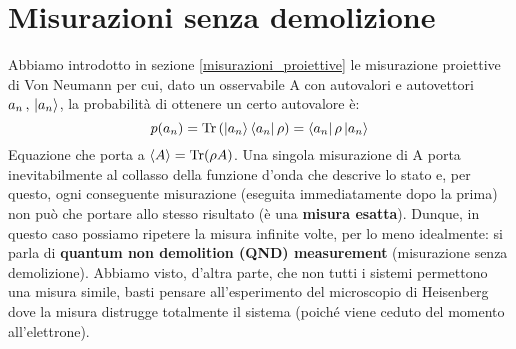 \section{Misurazioni senza demolizione}

\noindent Abbiamo introdotto in sezione \ref{misurazioni_proiettive} le misurazione proiettive di Von Neumann per cui, dato un osservabile A con autovalori e autovettori $a_n \, , \, \ket{a_n}$, la probabilità di ottenere un certo autovalore è:
\begin{equation*}
    p(a_n) = \Tr \left( \ket{a_n}\bra{a_n}\rho \right) = \bra{a_n}\rho \ket{a_n}
\end{equation*}
Equazione che porta a $\expval A = \Tr (\rho A)$.
Una singola misurazione di A porta inevitabilmente al collasso della funzione d'onda che descrive lo stato e, per questo, ogni conseguente misurazione (eseguita immediatamente dopo la prima) non può che portare allo stesso risultato (è una \textbf{misura esatta}). Dunque, in questo caso possiamo ripetere la misura infinite volte, per lo meno idealmente: si parla di \textbf{quantum non demolition (QND) measurement} (misurazione senza demolizione). 
Abbiamo visto, d'altra parte, che non tutti i sistemi permettono una misura simile, basti pensare all'esperimento del microscopio di Heisenberg dove la misura distrugge totalmente il sistema (poiché viene ceduto del momento all'elettrone).
